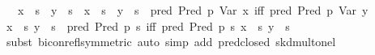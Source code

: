 \begin{isabellebody}
\ \ \ {}x\ {}{}\ s\ {}\ y\ {}{}\ s\ {}\ x\ {}{}\ s\ {}\ y\ {}{}\ s\ {}\ {}pred\ {}Pred\ p\ {}Var\ x{}{}\ iff\ pred\ {}Pred\ p\ {}Var\ y{}{}{}{}\isanewline
%
\isadelimproof
%
\endisadelimproof
%
\isatagproof
{}\isamarkupfalse%
\ {}\isanewline
\ \ \isamarkupfalse%
\ {}x\ {}{}\ s{}\ y\ {}{}\ s\ {}\ pred\ {}Pred\ p\ {}s{}{}\ iff\ pred\ {}Pred\ p\ {}s{}{}{}\ x\ {}{}\ s{}\ y\ {}{}\ s{}\isanewline
\ \ \ \ \isamarkupfalse%
\ {}subst\ bicon{}refl{}symmetric{}{}\ {}auto\ simp\ add{}\ pred{}closed\ skd{}mult{}onel{}\isanewline
\ \ \isamarkupfalse%
\ \isamarkupfalse%

\end{isabellebody}
